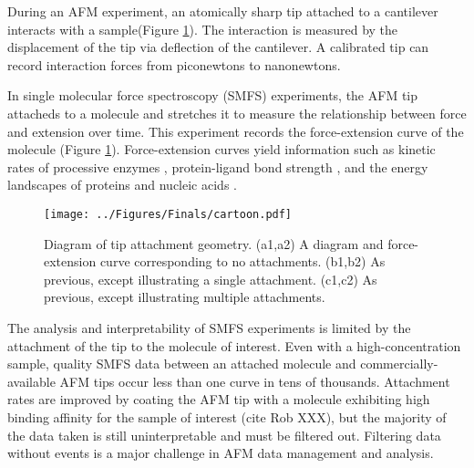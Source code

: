 \documentclass[%
  aip,12pt,tightenlines,
  amsthm,
 amsmath,amssymb
]{article}
\newcommand{\fRef}[1]{Figure \ref{figure:#1}}
\newcommand{\fLabel}[1]{\label{figure:#1}}
\newcommand{\pl}[0]{\vspace{6pt}}
\newcommand{\pEndF}[0]{ \\ }
\newcommand{\pStartF}[0]{ }
\newcommand{\figwidth}[0]{\linewidth}
\newcommand{\singlemol}[0]{SMFS}
\newcommand{\citePRH}[1]{\cite{#1}}
\begin{document}
During an AFM experiment, an atomically sharp tip attached to a cantilever interacts with a sample(\fRef{Cartoon}). The interaction is measured by the displacement of the tip via deflection of the cantilever. A calibrated tip can record interaction forces from piconewtons to nanonewtons. \pl

In single molecular force spectroscopy (\singlemol{}) experiments, the AFM tip attacheds to a molecule and stretches it to measure the relationship between force and extension over time. This experiment records the force-extension curve of the molecule (\fRef{Cartoon}). Force-extension curves yield information such as kinetic rates of processive enzymes \citePRH{comstock_direct_2015}, protein-ligand bond strength \citePRH{yuan_energy_2000}, and the energy landscapes of proteins and nucleic acids \citePRH{dudko_Theory_2008}. \pl

\begin{figure}
\centering
\texttt{[image: ../Figures/Finals/cartoon.pdf]}%
\caption[Diagram of AFM attachment geometry]{\fLabel{Cartoon}\pStartF Diagram of tip attachment geometry. (a1,a2) A diagram and force-extension curve corresponding to no attachments. (b1,b2) As previous, except illustrating a single attachment. (c1,c2) As previous, except illustrating multiple attachments. \pEndF }
\end{figure}


The analysis and interpretability of \singlemol{} experiments is limited by the attachment of the tip to the molecule of interest. Even with a high-concentration sample, quality \singlemol{} data between an attached molecule and commercially-available AFM tips occur less than one curve in tens of thousands\cite{bosshart_reference-free_2012}. Attachment rates are improved by coating the AFM tip with a molecule exhibiting high binding affinity for the sample of interest (cite Rob XXX), but the majority of the data taken is still uninterpretable and must be filtered out. Filtering data without events is a major challenge in AFM data management and analysis.\pl
\end{document}
